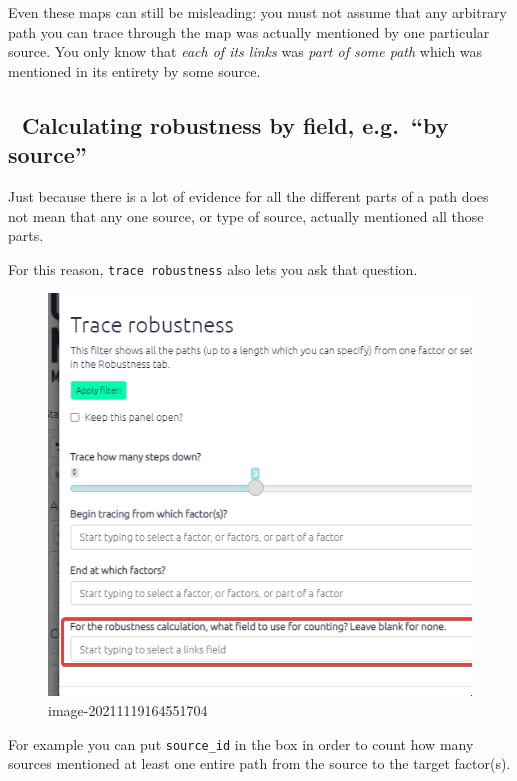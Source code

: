\documentclass[
]{book}
\begin{document}
Even these maps can still be misleading: you must not assume that any arbitrary path you can trace through the map was actually mentioned by one particular source. You only know that \emph{each of its links} was \emph{part of some path} which was mentioned in its entirety by some source.

\hypertarget{calculating-robustness-by-field-e.g.-by-source}{%
\subsection{🧪 Calculating robustness by field, e.g.~``by source''}\label{calculating-robustness-by-field-e.g.-by-source}}

Just because there is a lot of evidence for all the different parts of a path does not mean that any one source, or type of source, actually mentioned all those parts.

For this reason, \texttt{trace\ robustness} also lets you ask that question.

\begin{figure}
\centering
\includegraphics{_assets/image-20211119164551704.png}
\caption{image-20211119164551704}
\end{figure}

For example you can put \texttt{source\_id} in the box in order to count how many sources mentioned at least one entire path from the source to the target factor(s).
\end{document}
